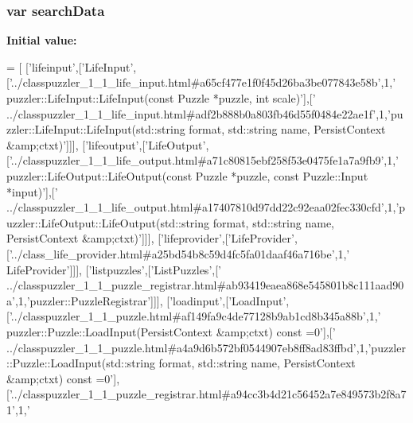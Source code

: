 \subsubsection[{search\+Data}]{\setlength{\rightskip}{0pt plus 5cm}var search\+Data}\label{a00088_ad01a7523f103d6242ef9b0451861231e}
{\bfseries Initial value\+:}
\begin{DoxyCode}
=
[
  [\textcolor{stringliteral}{'lifeinput'},[\textcolor{stringliteral}{'LifeInput'},[\textcolor{stringliteral}{'../classpuzzler\_1\_1\_life\_input.html#a65cf477e1f0f45d26ba3be077843e58b'},1,\textcolor{stringliteral}{'
      puzzler::LifeInput::LifeInput(const Puzzle *puzzle, int scale)'}],[\textcolor{stringliteral}{'
      ../classpuzzler\_1\_1\_life\_input.html#adf2b888b0a803fb46d55f0484e22ae1f'},1,\textcolor{stringliteral}{'puzzler::LifeInput::LifeInput(std::string format, std::string name,
       PersistContext &amp;ctxt)'}]]],
  [\textcolor{stringliteral}{'lifeoutput'},[\textcolor{stringliteral}{'LifeOutput'},[\textcolor{stringliteral}{'../classpuzzler\_1\_1\_life\_output.html#a71c80815ebf258f53e0475fe1a7a9fb9'},1,\textcolor{stringliteral}{'
      puzzler::LifeOutput::LifeOutput(const Puzzle *puzzle, const Puzzle::Input *input)'}],[\textcolor{stringliteral}{'
      ../classpuzzler\_1\_1\_life\_output.html#a17407810d97dd22c92eaa02fec330cfd'},1,\textcolor{stringliteral}{'puzzler::LifeOutput::LifeOutput(std::string format,
       std::string name, PersistContext &amp;ctxt)'}]]],
  [\textcolor{stringliteral}{'lifeprovider'},[\textcolor{stringliteral}{'LifeProvider'},[\textcolor{stringliteral}{'../class\_life\_provider.html#a25bd54b8c59d4fc5fa01daaf46a716be'},1,\textcolor{stringliteral}{'
      LifeProvider'}]]],
  [\textcolor{stringliteral}{'listpuzzles'},[\textcolor{stringliteral}{'ListPuzzles'},[\textcolor{stringliteral}{'
      ../classpuzzler\_1\_1\_puzzle\_registrar.html#ab93419eaea868e545801b8c111aad90a'},1,\textcolor{stringliteral}{'puzzler::PuzzleRegistrar'}]]],
  [\textcolor{stringliteral}{'loadinput'},[\textcolor{stringliteral}{'LoadInput'},[\textcolor{stringliteral}{'../classpuzzler\_1\_1\_puzzle.html#af149fa9c4de77128b9ab1cd8b345a88b'},1,\textcolor{stringliteral}{'
      puzzler::Puzzle::LoadInput(PersistContext &amp;ctxt) const =0'}],[\textcolor{stringliteral}{'
      ../classpuzzler\_1\_1\_puzzle.html#a4a9d6b572bf0544907eb8ff8ad83ffbd'},1,\textcolor{stringliteral}{'puzzler::Puzzle::LoadInput(std::string format, std::string name, PersistContext
       &amp;ctxt) const =0'}],[\textcolor{stringliteral}{'../classpuzzler\_1\_1\_puzzle\_registrar.html#a94cc3b4d21c56452a7e849573b2f8a71'},1,\textcolor{stringliteral}{'
}
\end{DoxyCode}
